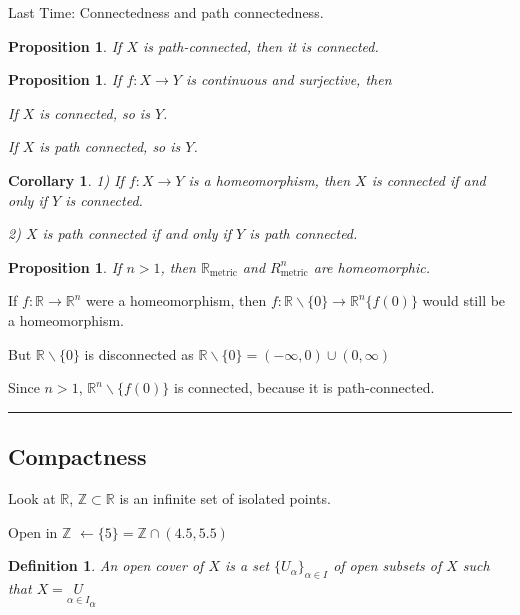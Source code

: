 \documentclass[twoside]{article}
\newcommand{\Z}{\mathbb{Z}}
\newcommand{\metric}{\text{metric}}
\newtheorem{proposition}[theorem]{Proposition}
\newtheorem{corollary}[theorem]{Corollary}
\newtheorem{definition}[theorem]{Definition}
\newenvironment{proof}{{\bf Proof:}}{\hfill\rule{2mm}{2mm}}
\newcommand\R{\mathbb{R}}
\begin{document}
Last Time: Connectedness and path connectedness. 

\begin{proposition}
    If $X$ is path-connected, then it is connected. 
\end{proposition}

\begin{proposition}
    If $f: X \rightarrow Y$ is continuous and surjective, then 

    If $X$ is connected, so is $Y$.

    If $X$ is path connected, so is $Y$.
    
\end{proposition}

\begin{corollary}
    1) If $f:X\rightarrow Y$ is a homeomorphism, then $X$ is connected if and only if $Y$ is connected. 

    2) $X$ is path connected if and only if $Y$ is path connected. 
\end{corollary}

\begin{proposition}
    If $n > 1$, then $\R_\metric$ and $R^n_\metric$ are homeomorphic. 
\end{proposition}

\begin{proof}
    If $f: \R \rightarrow \R^n$ were a homeomorphism, then $f: \R\backslash\{0\} \rightarrow \R^n\{f(0)\}$ would still be a homeomorphism.
    
    But $\R\backslash\{0\}$ is disconnected as  $\R\backslash\{0\} = (-\infty, 0)\cup(0,\infty)$

    Since $n > 1$, $\R^n\backslash\{f(0)\}$ is connected, because it is path-connected. 
\end{proof}

\subsection{Compactness}

Look at $\R$, $\Z \subset \R$ is an infinite set of isolated points. 

Open in $\Z$ $\leftarrow \{5\}= \Z\cap (4.5,5.5)$

\begin{definition}
    An open cover of $X$ is a set $\{U_\alpha\}_{\alpha\in I}$ of open subsets of $X$ such that $X = \underset{\alpha \in I}U_\alpha$
\end{definition}
\end{document}
